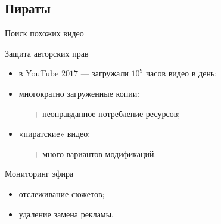 \subsection{Пираты}

\begin{frame}{Поиск похожих видео}
    \begin{orange-box}{Защита авторских прав}
        \begin{itemize}
            \item в YouTube $2017$ — загружали $10^{9}$ 
                часов видео в день;
            \item многократно загруженные копии:
            \begin{itemize}
                \item[$+$] неоправданное потребление ресурсов;
            \end{itemize}
            \item «пиратские» видео:
            \begin{itemize}
                \item[$+$] много вариантов модификаций.
            \end{itemize}
        \end{itemize}
    \end{orange-box}
    \vspace{2em}
    \begin{blue-box}{Мониторинг эфира}
        \begin{itemize}
            \item отслеживание сюжетов;
            \item \sout{удаление} замена рекламы.
        \end{itemize}
    \end{blue-box}
\end{frame}




